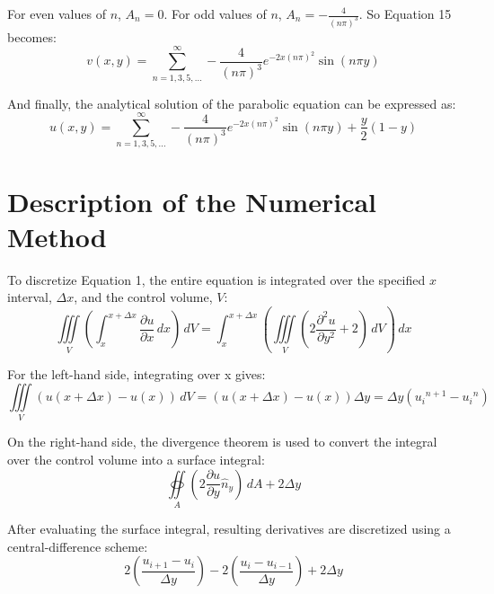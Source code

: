 \documentclass[letterpaper,12pt]{article}
\begin{document}
For even values of $n$, $A_n = 0$. For odd values of $n$, $A_n = -\frac{4}{\left(n \pi\right)^3}$. So Equation 15 becomes:
\begin{equation}
v(x,y) = \sum_{n=1,3,5,...}^{\infty} -\frac{4}{(n \pi)^3} e^{-2x (n \pi)^2} \sin(n \pi y)
\end{equation}

And finally, the analytical solution of the parabolic equation can be expressed as:
\begin{equation}
\boxed{
u(x,y) = \sum_{n=1,3,5,...}^{\infty} -\frac{4}{(n \pi)^3} e^{-2x (n \pi)^2} \sin(n \pi y) + \frac{y}{2} \left(1 - y\right)
}
\end{equation}

\section{Description of the Numerical Method}

To discretize Equation 1, the entire equation is integrated over the specified $x$ interval, $\Delta x$, and the control volume, $V$:
\begin{equation}
\iiint\limits_{V} \left(\int_{x}^{x+\Delta x} \frac {\partial u}{\partial x}\, dx\right)\, dV = \int_{x}^{x+\Delta x} \left(\iiint\limits_{V} \left(2 \frac{\partial^2 u}{\partial y^2} + 2\right)\, dV\right)\, dx
\end{equation}

For the left-hand side, integrating over x gives:
\begin{equation}
\iiint\limits_{V} \left(u(x + \Delta x) - u(x)\right)\, dV = \left(u(x + \Delta x) - u(x)\right) \Delta y = \Delta y \left({u_{i}}^{n+1} - {u_{i}}^{n}\right)
\end{equation}

On the right-hand side, the divergence theorem is used to convert the integral over the control volume into a surface integral:
\begin{equation}
\oiint\limits_{A}\left(2 \frac{\partial u}{\partial y} \hat{n}_{y}\right)\, dA + 2 \Delta y 
\end{equation}

After evaluating the surface integral, resulting derivatives are discretized using a central-difference scheme:
\begin{equation}
2\left( \frac{u_{i+1} - u_{i}}{\Delta y}\right) - 2 \left(\frac{u_{i} - u_{i-1}}{\Delta y}\right) + 2 \Delta y 
\end{equation}
\end{document}
